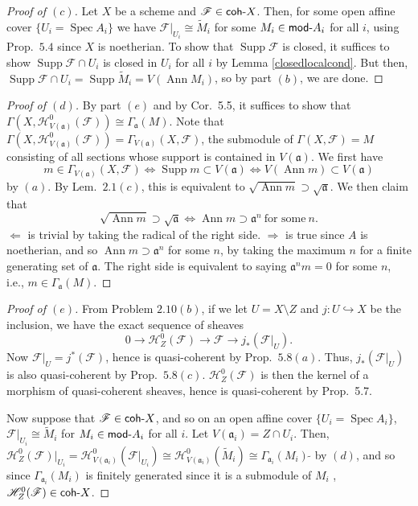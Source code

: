 \documentclass[12pt,letterpaper]{article}
\theoremstyle{definition}
\theoremstyle{remark}
\numberwithin{equation}{section}
\numberwithin{figure}{problem}
\DeclareMathOperator{\Ann}{Ann}
\DeclareMathOperator{\Supp}{Supp}
\DeclareMathOperator{\Spec}{Spec}
\newcommand{\FF}{\mathscr{F}}
\newcommand{\HH}{\mathscr{H}}
\newcommand{\Mod}{\mathsf{mod}\mathchar`-}
\newcommand{\coh}{\mathsf{coh}\mathchar`-}
\begin{document}
\begin{proof}[Proof of $(c)$]
  Let $X$ be a scheme and $\FF \in \coh X$. Then, for some open affine cover $\{U_i = \Spec A_i\}$ we have $\FF\vert_{U_i} \cong \tilde{M}_i$ for some $M_i \in \Mod A_i$ for all $i$, using Prop.~$5.4$ since $X$ is noetherian. To show that $\Supp \FF$ is closed, it suffices to show $\Supp \FF \cap U_i$ is closed in $U_i$ for all $i$ by Lemma \ref{closedlocalcond}. But then, $\Supp \FF \cap U_i = \Supp \tilde{M}_i = V(\Ann M_i)$, so by part $(b)$, we are done.
\end{proof}
\begin{proof}[Proof of $(d)$]
  By part $(e)$ and by Cor.~5.5, it suffices to show that $\Gamma(X,\HH_{V(\mathfrak{a})}^0(\FF)) \cong \Gamma_\mathfrak{a}(M)$. Note that $\Gamma(X,\HH_{V(\mathfrak{a})}^0(\FF)) = \Gamma_{V(\mathfrak{a})}(X,\FF)$, the submodule of $\Gamma(X,\FF) = M$ consisting of all sections whose support is contained in $V(\mathfrak{a})$. We first have
  \begin{equation*}
    m \in \Gamma_{V(\mathfrak{a})}(X,\FF) \iff \Supp m \subset V(\mathfrak{a}) \iff V(\Ann m) \subset V(\mathfrak{a})
  \end{equation*}
  by $(a)$. By Lem.~$2.1(c)$, this is equivalent to $\sqrt{\Ann m} \supset \sqrt{\mathfrak{a}}$. We then claim that
  \begin{equation*}
    \sqrt{\Ann m} \supset \sqrt{\mathfrak{a}} \iff \Ann m \supset \mathfrak{a}^n~\text{for some}~n.
  \end{equation*}
  $\Leftarrow$ is trivial by taking the radical of the right side. $\Rightarrow$ is true since $A$ is noetherian, and so $\Ann m \supset \mathfrak{a}^n$ for some $n$, by taking the maximum $n$ for a finite generating set of $\mathfrak{a}$. The right side is equivalent to saying $\mathfrak{a}^nm = 0$ for some $n$, i.e., $m \in \Gamma_\mathfrak{a}(M)$.
\end{proof}
\begin{proof}[Proof of $(e)$]
  From Problem $2.10(b)$, if we let $U = X \setminus Z$ and $j\colon U \hookrightarrow X$ be the inclusion, we have the exact sequence of sheaves
  \begin{equation*}
    0 \longrightarrow \HH_{Z}^0(\FF) \longrightarrow \FF \longrightarrow j_*(\FF\vert_U).
  \end{equation*}
  Now $\FF\vert_U = j^*(\FF)$, hence is quasi-coherent by Prop.~$5.8(a)$. Thus, $j_*(\FF\vert_U)$ is also quasi-coherent by Prop.~$5.8(c)$. $\HH_{Z}^0(\FF)$ is then the kernel of a morphism of quasi-coherent sheaves, hence is quasi-coherent by Prop.~5.7. 
  \par Now suppose that $\FF \in \coh X$, and so on an open affine cover $\{U_i = \Spec A_i\}$, $\FF\vert_{U_i} \cong \tilde{M}_i$ for $M_i \in \Mod A_i$ for all $i$. Let $V(\mathfrak{a}_i) = Z \cap U_i$. Then, $\HH_{Z}^0(\FF)\vert_{U_i} = \HH_{V(\mathfrak{a}_i)}^0(\FF\vert_{U_i}) \cong \HH_{V(\mathfrak{a}_i)}^0(\tilde{M}_i) \cong \Gamma_{\mathfrak{a}_i}(M_i)\:\tilde{}$ by $(d)$, and so since $\Gamma_{\mathfrak{a}_i}(M_i)$ is finitely generated since it is a submodule of $M_i$ \cite[Prop.~6.2]{AM69}, $\HH_{Z}^0(\FF) \in \coh X$.
\end{proof}
\end{document}
